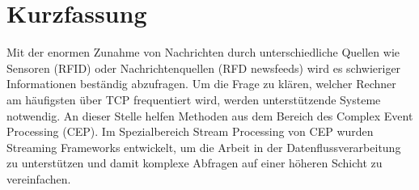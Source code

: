 

\section*{Kurzfassung}
Mit der enormen Zunahme von Nachrichten durch unterschiedliche Quellen wie Sensoren (RFID) oder 
Nachrichtenquellen (RFD newsfeeds) wird es schwieriger Informationen beständig abzufragen. Um die
Frage zu klären, welcher Rechner am häufigsten über TCP frequentiert wird, werden unterstützende 
Systeme notwendig. An dieser Stelle helfen Methoden aus dem Bereich des Complex Event Processing (CEP).
Im Spezialbereich Stream Processing von CEP wurden Streaming Frameworks entwickelt, 
um die Arbeit in der Datenflussverarbeitung zu unterstützen und damit komplexe Abfragen auf einer höheren
Schicht zu vereinfachen.

